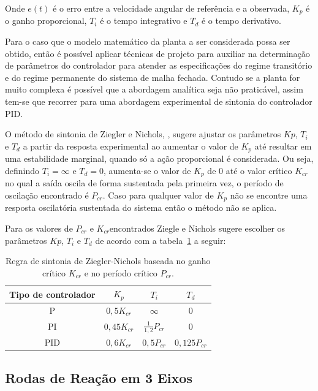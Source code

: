 Onde $e(t)$ é o erro entre a velocidade angular de referência e a observada, $K_p$ é o ganho proporcional, $T_i$ é o tempo integrativo e $T_d$ é o tempo derivativo.

Para o caso que o modelo matemático da planta a ser considerada possa ser obtido, então é possível aplicar técnicas de projeto para auxiliar na determinação de parâmetros do controlador para atender as especificações do regime transitório e do regime permanente do sistema de malha fechada. Contudo se a planta for muito complexa é possível que a abordagem analítica seja não praticável, assim tem-se que recorrer para uma abordagem experimental de sintonia do controlador PID.

O método de sintonia  de Ziegler e Nichols, \cite[p.~524]{ogata2011engenharia}, sugere ajustar os parâmetros $Kp$, $T_i$ e $T_d$ a partir da resposta experimental ao aumentar o valor de $K_p$ até resultar em uma estabilidade marginal, quando só a ação proporcional é considerada. Ou seja, definindo $T_i=\infty$ e $T_d=0$, aumenta-se o valor de $K_p$ de 0 até o valor crítico $K_{cr}$no qual a saída oscila de forma sustentada pela primeira vez, o período de oscilação encontrado é $P_{cr}$. Caso para qualquer valor de $K_p$ não se encontre uma resposta oscilatória sustentada do sistema então o método não se aplica.

Para os valores de $P_{cr}$ e $K_{cr}$encontrados Ziegle e Nichols sugere escolher os parâmetros $Kp$, $T_i$ e $T_d$ de acordo com a  tabela~\ref{tab:1} a seguir:

\begin{table}[htpb]
\centering
\caption{Regra de sintonia de Ziegler-Nichols baseada no ganho crítico $K_{cr}$ e no período crítico $P_{cr}$.}\label{tab:1}
\begin{tabular}{|c|c|c|c|}
\hline
\small{Tipo de controlador} & \small{$K_p$} & \small{$T_i$} & \small{$T_d$} \\ \hline
P&$0,5K_{cr}$&$\infty$&$0$\\\hline
PI& $0,45K_{cr}$&$\frac{1}{1,2}P_{cr}$&$0$\\\hline
PID	& $0,6K_{cr}$&$0,5P_{cr}$&$0,125P_{cr}$\\\hline
\end{tabular}
\end{table}


\subsection{Rodas de Reação em 3 Eixos}\label{sec:3.1.6.1}


